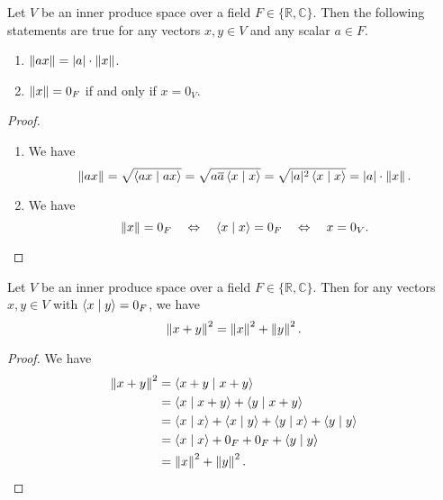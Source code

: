 \begin{proposition}
  Let $V$ be an inner produce space over a field
  $F \in \{\mathbb{R}, \mathbb{C}\}$.
  Then the following statements are true for any vectors $x, y \in V$ and any
  scalar $a \in F$.
  \begin{enumerate}
    \item $\left\Vert ax \right\Vert = |a| \cdot \left\Vert x \right\Vert$.
    \item $\left\Vert x \right\Vert = 0_F$ if and only if $x = 0_V$.
  \end{enumerate}
\end{proposition}
\begin{proof}
  \leavevmode
  \begin{enumerate}
    \item We have
    \begin{equation*}
      \left\Vert ax \right\Vert
      = \sqrt{\left\langle ax \; \middle| \; ax \right\rangle}
      = \sqrt{a\overline{a}\left\langle x \; \middle| \; x \right\rangle}
      = \sqrt{|a|^2 \left\langle x \; \middle| \; x \right\rangle}
      = |a| \cdot \left\Vert x \right\Vert.
    \end{equation*}

    \item We have
    \begin{equation*}
      \left\Vert x \right\Vert = 0_F
      \quad \Leftrightarrow \quad
      \left\langle x \; \middle| \; x \right\rangle = 0_F
      \quad \Leftrightarrow \quad
      x = 0_V.
    \end{equation*}
  \end{enumerate}
\end{proof}

\begin{theorem}
  \label{thm:pythagoras}
  Let $V$ be an inner produce space over a field
  $F \in \{\mathbb{R}, \mathbb{C}\}$.
  Then for any vectors $x, y \in V$ with $\left\langle x \; \middle| \; y \right\rangle = 0_F$, we have
  \begin{equation*}
    \left\Vert x + y \right\Vert^2 = \left\Vert x \right\Vert^2 + \left\Vert y \right\Vert^2.
  \end{equation*}
\end{theorem}
\begin{proof}
  We have
  \begin{align*}
    \left\Vert x + y \right\Vert^2
    &= \left\langle x + y \; \middle| \; x + y \right\rangle \\
    &= \left\langle x \; \middle| \; x + y \right\rangle + \left\langle y \; \middle| \; x + y \right\rangle \\
    &= \left\langle x \; \middle| \; x \right\rangle + \left\langle x \; \middle| \; y \right\rangle + \left\langle y \; \middle| \; x \right\rangle + \left\langle y \; \middle| \; y \right\rangle \\
    &= \left\langle x \; \middle| \; x \right\rangle + 0_F + 0_F + \left\langle y \; \middle| \; y \right\rangle \\
    &= \left\Vert x \right\Vert^2 + \left\Vert y \right\Vert^2.
    \qedhere
  \end{align*}
\end{proof}

